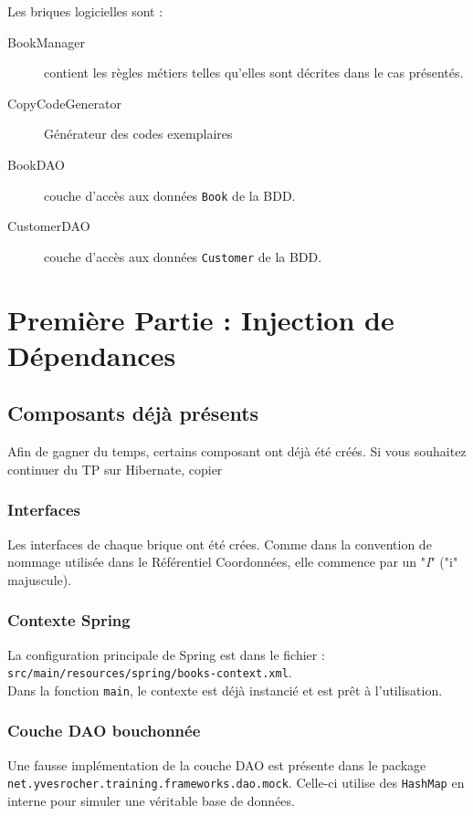 \documentclass[small,algo]{dushClass}
\begin{document}
Les briques logicielles sont :
\begin{description}
\item[BookManager] contient les règles métiers telles qu'elles sont décrites dans le cas présentés.
\item[CopyCodeGenerator] Générateur des codes exemplaires
\item[BookDAO] couche d'accès aux données \texttt{Book} de la BDD.
\item[CustomerDAO] couche d'accès aux données \texttt{Customer} de la BDD.
\end{description}


\section{Première Partie : Injection de Dépendances}


\subsection{Composants déjà présents}
Afin de gagner du temps, certains composant ont déjà été créés. Si vous souhaitez continuer du TP sur Hibernate, copier

\subsubsection{Interfaces}
Les interfaces de chaque brique ont été crées. Comme dans la convention de nommage utilisée dans le Référentiel Coordonnées, elle commence par un "\emph{I}" ("i" majuscule).

\subsubsection{Contexte Spring}
La configuration principale de Spring est dans le fichier : \texttt{src/main/resources/spring/books-context.xml}.\\

Dans la fonction \texttt{main}, le contexte est déjà instancié et est prêt à l'utilisation.

\subsubsection{Couche DAO bouchonnée}
Une fausse implémentation de la couche DAO est présente dans le package \texttt{net.yvesrocher.training.frameworks.dao.mock}. Celle-ci utilise des \texttt{HashMap} en interne pour simuler une véritable base de données.\\
\end{document}
